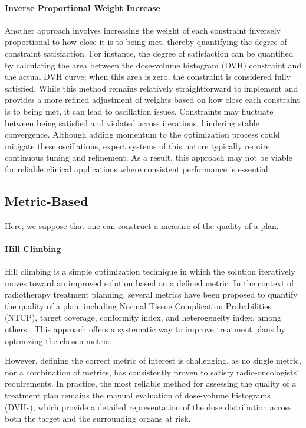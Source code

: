 \paragraph{Inverse Proportional Weight Increase}
Another approach involves increasing the weight of each constraint inversely proportional to how close it is to being met, thereby quantifying the degree of constraint satisfaction.
For instance, the degree of satisfaction can be quantified by calculating the area between the dose-volume histogram (DVH) constraint and the actual DVH curve; when this area is zero, the constraint is considered fully satisfied.
While this method remains relatively straightforward to implement and provides a more refined adjustment of weights based on how close each constraint is to being met, it can lead to oscillation issues.
Constraints may fluctuate between being satisfied and violated across iterations, hindering stable convergence.
Although adding momentum to the optimization process could mitigate these oscillations, expert systems of this nature typically require continuous tuning and refinement.
As a result, this approach may not be viable for reliable clinical applications where consistent performance is essential.

\subsection{Metric-Based}
Here, we suppose that one can construct a measure of the quality of a plan.

\paragraph{Hill Climbing}
Hill climbing \cite{skienna2008} is a simple optimization technique in which the solution iteratively moves toward an improved solution based on a defined metric.
In the context of radiotherapy treatment planning, several metrics have been proposed to quantify the quality of a plan, including Normal Tissue Complication Probabilities (NTCP), target coverage, conformity index, and heterogeneity index, among others \cite{lyman_normal_1992,li_input_2022} \label{metrics}.
This approach offers a systematic way to improve treatment plans by optimizing the chosen metric.

However, defining the correct metric of interest is challenging, as no single metric, nor a combination of metrics, has consistently proven to satisfy radio-oncologists' requirements.
In practice, the most reliable method for assessing the quality of a treatment plan remains the manual evaluation of dose-volume histograms (DVHs), which provide a detailed representation of the dose distribution across both the target and the surrounding organs at risk.

